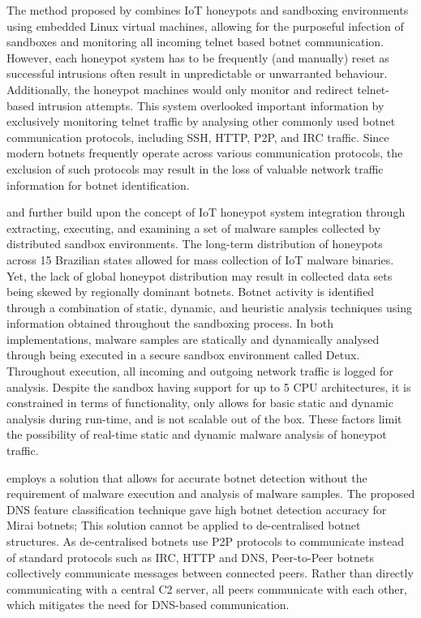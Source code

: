 The method proposed by \citep{PaPa2016} combines IoT honeypots and sandboxing environments using embedded Linux virtual machines, allowing for the purposeful infection of sandboxes and monitoring all incoming telnet based botnet communication. However, each honeypot system has to be frequently (and manually) reset as successful intrusions often result in unpredictable or unwarranted behaviour. Additionally, the honeypot machines would only monitor and redirect telnet-based intrusion attempts. This system overlooked important information by exclusively monitoring telnet traffic by analysing other commonly used botnet communication protocols, including SSH, HTTP, P2P, and IRC traffic. Since modern botnets frequently operate across various communication protocols, the exclusion of such protocols may result in the loss of valuable network traffic information for botnet identification.

\citet{Bastos2019} and \citet{Ceron2019} further build upon the concept of IoT honeypot system integration through extracting, executing, and examining a set of malware samples collected by distributed sandbox environments. The long-term distribution of honeypots across 15 Brazilian states allowed for mass collection of IoT malware binaries. Yet, the lack of global honeypot distribution may result in collected data sets being skewed by regionally dominant botnets. Botnet activity is identified through a combination of static, dynamic, and heuristic analysis techniques using information obtained throughout the sandboxing process. In both implementations, malware samples are statically and dynamically analysed through being executed in a secure sandbox environment called Detux. \citep{Detux2016} Throughout execution, all incoming and outgoing network traffic is logged for analysis. Despite the sandbox having support for up to 5 CPU architectures, it is constrained in terms of functionality, only allows for basic static and dynamic analysis during run-time, and is not scalable out of the box. These factors limit the possibility of real-time static and dynamic malware analysis of honeypot traffic.

\citet{Dwyer2019} employs a solution that allows for accurate botnet detection without the requirement of malware execution and analysis of malware samples. The proposed DNS feature classification technique gave high botnet detection accuracy for Mirai botnets; This solution cannot be applied to de-centralised botnet structures. As de-centralised botnets use P2P protocols to communicate instead of standard protocols such as IRC, HTTP and DNS, Peer-to-Peer botnets collectively communicate messages between connected peers. Rather than directly communicating with a central C2 server, all peers communicate with each other, which mitigates the need for DNS-based communication.


